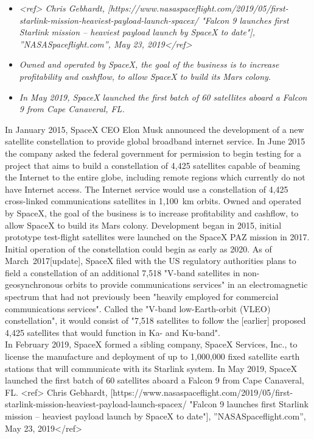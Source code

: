 \begin{itemize}
\item
  \emph{\textless{}ref\textgreater{} Chris Gebhardt,
  {[}https://www.nasaspaceflight.com/2019/05/first-starlink-mission-heaviest-payload-launch-spacex/
  "Falcon 9 launches first Starlink mission -- heaviest payload launch
  by SpaceX to date"{]}, ''NASASpaceflight.com'', May 23,
  2019\textless{}/ref\textgreater{}}
\item
  \emph{Owned and operated by SpaceX, the goal of the business is to
  increase profitability and cashflow, to allow SpaceX to build its Mars
  colony.}
\item
  \emph{In May 2019, SpaceX launched the first batch of 60 satellites
  aboard a Falcon 9 from Cape Canaveral, FL.}
\end{itemize}

In January 2015, SpaceX CEO Elon Musk announced the development of a new
satellite constellation to provide global broadband internet service. In
June 2015 the company asked the federal government for permission to
begin testing for a project that aims to build a constellation of 4,425
satellites capable of beaming the Internet to the entire globe,
including remote regions which currently do not have Internet access.
The Internet service would use a constellation of 4,425 cross-linked
communications satellites in 1,100~km orbits. Owned and operated by
SpaceX, the goal of the business is to increase profitability and
cashflow, to allow SpaceX to build its Mars colony. Development began in
2015, initial prototype test-flight satellites were launched on the
SpaceX PAZ mission in 2017. Initial operation of the constellation could
begin as early as 2020. As of March~2017{[}update{]}, SpaceX filed with
the US regulatory authorities plans to field a constellation of an
additional 7,518 "V-band satellites in non-geosynchronous orbits to
provide communications services" in an electromagnetic spectrum that had
not previously been "heavily employed for commercial communications
services". Called the "V-band low-Earth-orbit (VLEO) constellation", it
would consist of "7,518 satellites to follow the {[}earlier{]} proposed
4,425 satellites that would function in Ka- and Ku-band".\\
In February 2019, SpaceX formed a sibling company, SpaceX Services,
Inc., to license the manufacture and deployment of up to 1,000,000 fixed
satellite earth stations that will communicate with its Starlink system.
In May 2019, SpaceX launched the first batch of 60 satellites aboard a
Falcon 9 from Cape Canaveral, FL. \textless{}ref\textgreater{} Chris
Gebhardt,
{[}https://www.nasaspaceflight.com/2019/05/first-starlink-mission-heaviest-payload-launch-spacex/
"Falcon 9 launches first Starlink mission -- heaviest payload launch by
SpaceX to date"{]}, ''NASASpaceflight.com'', May 23,
2019\textless{}/ref\textgreater{}

